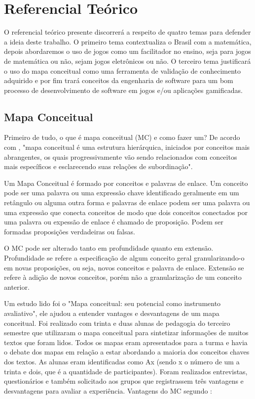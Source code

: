 \chapter[Referencial Teórico]{Referencial Teórico}
O referencial teórico presente discorrerá a respeito de quatro temas para defender a ideia deste trabalho. O primeiro tema contextualiza o Brasil com a matemática, depois abordaremos o uso de jogos como um facilitador no ensino, seja para jogos de matemática ou não, sejam jogos eletrônicos ou não. O terceiro tema justificará o uso do mapa conceitual como uma ferramenta de validação de conhecimento adquirido e por fim trará conceitos da engenharia de software para um bom processo de desenvolvimento de software em jogos e/ou aplicações gamificadas. 







\section[Mapa Conceitual]{Mapa Conceitual}
Primeiro de tudo, o que é mapa conceitual (MC) e como fazer um? De acordo com , "mapa conceitual é uma estrutura hierárquica, iniciados por conceitos mais abrangentes, os quais progressivamente vão sendo relacionados com conceitos mais específicos e esclarecendo suas relações de subordinação".

Um Mapa Conceitual é formado por conceitos e palavras de enlace. Um conceito pode ser uma palavra ou uma expressão chave identificado geralmente em um retângulo ou alguma outra forma e palavras de enlace podem ser uma palavra ou uma expressão que conecta conceitos de modo que dois conceitos conectados por uma palavra ou expessão de enlace é chamado de proposição. Podem ser formadas proposições verdadeiras ou falsas.

O MC pode ser alterado tanto em profundidade quanto em extensão. Profundidade se refere a especificação de algum conceito geral granularizando-o em novas proposições, ou seja, novos conceitos e palavra de enlace. Extensão se refere à adição de novos conceitos, porém não a granularização de um conceito anterior.

Um estudo lido foi o "Mapa conceitual: seu potencial como instrumento avaliativo", ele ajudou a entender vantages e desvantagens de um mapa conceitual. Foi realizado com trinta e duas alunas de pedagogia do terceiro semestre que utilizaram o mapa conceitual para sintetizar informações de muitos textos que foram lidos. Todos os mapas eram apresentados para a turma e havia o debate dos mapas em relação a estar abordando a maioria dos conceitos chaves dos textos. As alunas eram identificadas como Ax (sendo x o número de um a trinta e dois, que é a quantidade de participantes). Foram realizados entrevistas, questionários e também solicitado aos grupos que registrassem três vantagens e desvantagens para avaliar a experiência. Vantagens do MC segundo \cite{vantagensDesvantagensMC}: 

